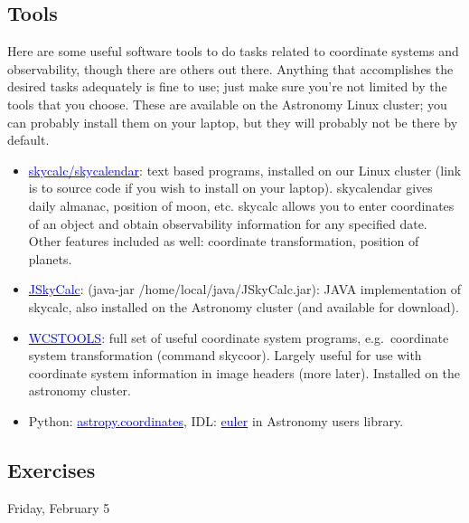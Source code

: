 \documentclass{article}
\begin{document}
\subsection*{Tools}
Here are some useful software tools to do tasks related to coordinate systems
and observability, though there are others out there. Anything that
accomplishes the desired tasks adequately is fine to use; just make sure
you're not limited by the tools that you choose. These are available
on the Astronomy Linux cluster; you can probably install them on your
laptop, but they will probably not be there by default.
\begin{itemize}
    \item \href{http://physics.dartmouth.edu/}
        {\textcolor{blue}{skycalc/skycalendar}}:
        text based programs, installed on our Linux cluster (link is
        to source code if you wish to install on your laptop).
        skycalendar gives daily almanac, position of moon, etc.
        skycalc allows you to enter coordinates of an object and
        obtain observability information for any specified date. Other
        features included as well: coordinate transformation, position
        of planets.
    \item \href{http://physics.dartmouth.edu/}
        {\textcolor{blue}{JSkyCalc}}:
        (java-jar /home/local/java/JSkyCalc.jar): JAVA implementation
        of skycalc, also installed on the Astronomy cluster (and
        available for download).
    \item \href{http://tdc-www.harvard.edu/wcstools/}
        {\textcolor{blue}{WCSTOOLS}}: full set of useful coordinate
        system programs, e.g.\ coordinate system transformation
        (command skycoor). Largely useful for use with coordinate
        system information in image
        headers (more later). Installed on the astronomy cluster.
    \item Python: \href{http://docs.astropy.org/en/stable/coordinates/}
        {\textcolor{blue}{astropy.coordinates}},
        IDL:
        \href{http://idlastro.gsfc.nasa.gov/ftp/pro/astro/euler.pro}
        {\textcolor{blue}{euler}} in Astronomy users library.
\end{itemize}

\subsection*{Exercises}

\newpage
\textcolor{date}{Friday, February 5}
\end{document}
